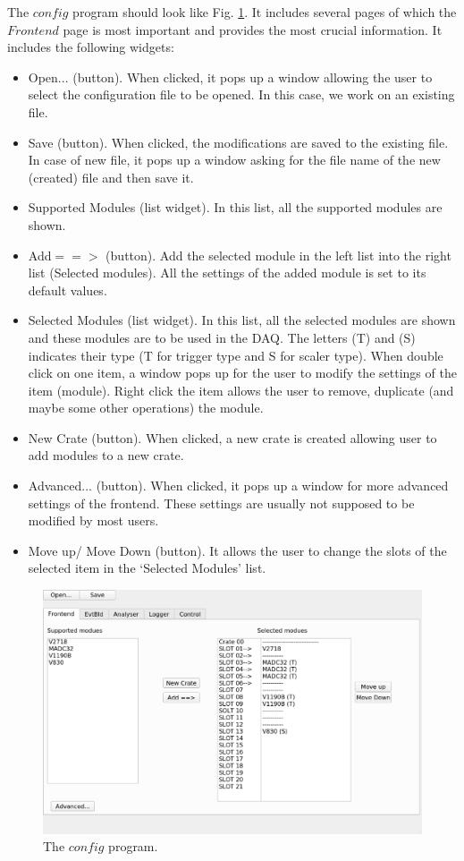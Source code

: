 \documentclass[a4paper,12pt]{article}
\begin{document}
	The $config$ program should look like Fig. \ref{fig05}. It includes
	several pages of which the $Frontend$ page is most important and
	provides the most crucial information. It includes the following
	widgets:
	\begin{itemize}
		\item Open... (button). When clicked, it pops up a window allowing
			the user to select the configuration file to be opened. In this
			case, we work on an existing file.
		\item Save (button). When clicked, the modifications are saved to
			the existing file. In case of new file, it pops up a window
			asking for the file name of the new (created) file and then save
			it.
		\item Supported Modules (list widget). In this list, all the
			supported modules are shown. 
		\item Add$==>$ (button). Add the selected module in the left list into
			the right list (Selected modules). All the settings of the added
			module is set to its default values.
		\item Selected Modules (list widget). In this list, all the selected
			modules are shown and these modules are to be used in the DAQ.
			The letters (T) and (S) indicates their type (T for trigger type
			and S for scaler type). When double click on one item, a window
			pops up for the user to modify the settings of the item
			(module). Right click the item allows the user to remove,
			duplicate (and maybe some other operations) the module. 
		\item New Crate (button). When clicked, a new crate is created
			allowing user to add modules to a new crate.
		\item Advanced... (button). When clicked, it pops up a window for
			more advanced settings of the frontend. These settings are
			usually not supposed to be modified by most users.
		\item Move up/ Move Down (button). It allows the user to change the
			slots of the selected item in the `Selected Modules' list.
	\end{itemize}
	\begin{figure}
		\begin{center}
			\includegraphics[width=.9\textwidth]{figs/config.eps}
			\caption{\label{fig05} The $config$ program. }
		\end{center}
	\end{figure}
\end{document}
